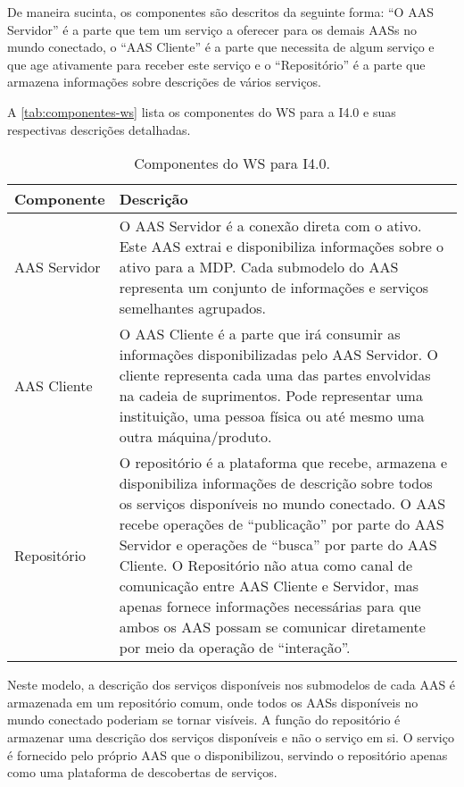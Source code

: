 	De maneira sucinta, os componentes são descritos da seguinte forma: ``O AAS Servidor'' é a parte que tem um serviço a oferecer para os demais AASs no mundo conectado, o ``AAS Cliente'' é a parte que necessita de algum serviço e que age ativamente para receber este serviço e o ``Repositório'' é a parte que armazena informações sobre descrições de vários serviços.
	
	A \autoref{tab:componentes-ws} lista os componentes do WS para a I4.0 e suas respectivas descrições detalhadas.
	
	\begin{table}[htb]
		\centering
		\caption{Componentes do WS para I4.0.}
		\label{tab:componentes-ws}
		\begin{tabular}{p{3cm}p{12cm}}
			\hline
			\textbf{Componente}
			& \textbf{Descrição} \\ 
			
			\hline
			AAS Servidor
			& O AAS Servidor é a conexão direta com o ativo. Este AAS extrai e disponibiliza informações sobre o ativo para a MDP. Cada submodelo do AAS representa um conjunto de informações e serviços semelhantes agrupados. \\
			
			\hline
			AAS Cliente
			& O AAS Cliente é a parte que irá consumir as informações disponibilizadas pelo AAS Servidor. O cliente representa cada uma das partes envolvidas na cadeia de suprimentos. Pode representar uma instituição, uma pessoa física ou até mesmo uma outra máquina/produto. \\
			
			\hline
			Repositório
			& O repositório é a plataforma que recebe, armazena e disponibiliza informações de descrição sobre todos os serviços disponíveis no mundo conectado. O AAS recebe operações de ``publicação'' por parte do AAS Servidor e operações de ``busca'' por parte do AAS Cliente. O Repositório não atua como canal de comunicação entre AAS Cliente e Servidor, mas apenas fornece informações necessárias para que ambos os AAS possam se comunicar diretamente por meio da operação de ``interação''. \\
			
			\hline
		\end{tabular}
	\end{table}
	
	Neste modelo, a descrição dos serviços disponíveis nos submodelos de cada AAS é armazenada em um repositório comum, onde todos os AASs disponíveis no mundo conectado poderiam se tornar visíveis. A função do repositório é armazenar uma descrição dos serviços disponíveis e não o serviço em si. O serviço é fornecido pelo próprio AAS que o disponibilizou, servindo o repositório apenas como uma plataforma de descobertas de serviços.

